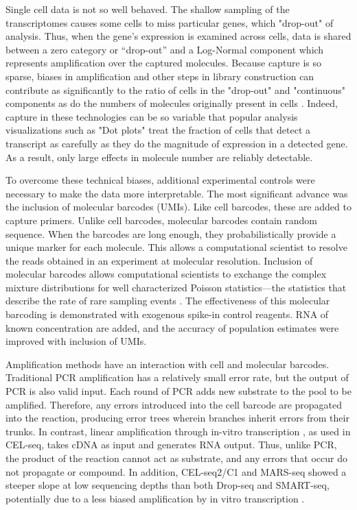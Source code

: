 Single cell data is not so well behaved.
The shallow sampling of the transcriptomes causes some cells to miss particular genes, which "drop-out" of analysis. 
Thus, when the gene's expression is examined across cells, data is shared between a zero category or “drop-out” and a Log-Normal component which represents amplification over the captured molecules. 
Because capture is so sparse, biases in amplification and other steps in library construction can contribute as significantly to the ratio of cells in the "drop-out" and "continuous" components as do the numbers of molecules originally present in cells \citep{Zheng2011,Dohm2008}.
Indeed, capture in these technologies can be so variable that popular analysis visualizations such as "Dot plots" treat the fraction of cells that detect a transcript as carefully as they do the magnitude of expression in a detected gene\cite{Shekhar2016}. 
As a result, only large effects in molecule number are reliably detectable. 

To overcome these technical biases, additional experimental controls were necessary to make the data more interpretable. 
The most significant advance was the inclusion of molecular barcodes (UMIs). 
Like cell barcodes, these are added to capture primers. 
Unlike cell barcodes, molecular barcodes contain random sequence. 
When the barcodes are long enough, they probabilistically provide a unique marker for each molecule. 
This allows a computational scientist to resolve the reads obtained in an experiment at molecular resolution. 
Inclusion of molecular barcodes allows computational scientists to exchange the complex mixture distributions for well characterized Poisson statistics---the statistics that describe the rate of rare sampling events \citep{Shiroguchi2012}.
The effectiveness of this molecular barcoding is demonstrated with exogenous spike-in control reagents. 
RNA of known concentration are added, and the accuracy of population estimates were improved with inclusion of UMIs. %

Amplification methods have an interaction with cell and molecular barcodes. 
Traditional PCR amplification has a relatively small error rate, but the output of PCR is also valid input. 
Each round of PCR adds new substrate to the pool to be amplified. 
Therefore, any errors introduced into the cell barcode are propagated into the reaction, producing error trees wherein branches inherit errors from their trunks. 
In contrast, linear amplification through in-vitro transcription \citep{Eberwine1992}, as used in CEL-seq, takes cDNA as input and generates RNA output. Thus, unlike PCR, the product of the reaction cannot act as substrate, and any errors that occur do not propagate or compound.
In addition, CEL-seq2/C1 and MARS-seq showed a steeper slope at low sequencing depths than both Drop-seq and SMART-seq, potentially due to a less biased amplification by in vitro transcription \citep{Ziegenhain2017}.


